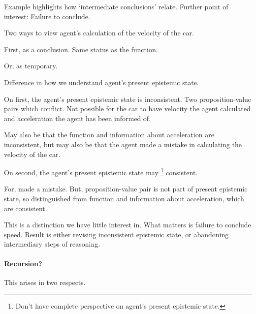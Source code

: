 \begin{note}
  Example highlights how `intermediate conclusions' relate.
  Further point of interest:
  Failure to conclude.

  Two ways to view agent's calculation of the velocity of the car.

  First, as a conclusion.
  Same status as the function.

  Or, as temporary.

  Difference in how we understand agent's present epistemic state.

  On first, the agent's present epistemic state is inconsistent.
  Two proposition-value pairs which conflict.
  Not possible for the car to have velocity the agent calculated and acceleration the agent has been informed of.

  May also be that the function and information about acceleration are inconsistent, but may also be that the agent made a mistake in calculating the velocity of the car.

  On second, the agent's present epistemic state may%
  \footnote{
    Don't have complete perspective on agent's present epistemic state.
  }
  consistent.

  For, made a mistake.
  But, proposition-value pair is not part of present epistemic state, so distinguished from function and information about acceleration, which are consistent.

  This is a distinction we have little interest in.
  What matters is failure to conclude speed.
  Result is either revising inconsistent epistemic state, or abandoning intermediary steps of reasoning.
\end{note}

\paragraph{Recursion?}

\begin{note}
  This arises in two respects.
\end{note}

